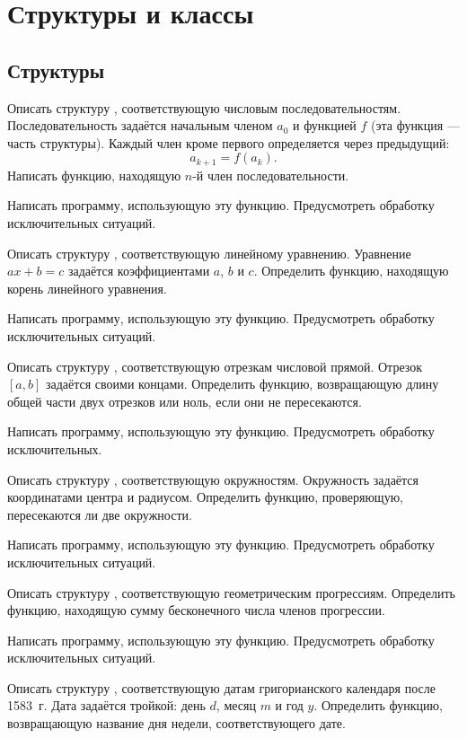 \section{Структуры и классы}

\subsection{Структуры}

\task Описать структуру , соответствующую числовым
последовательностям. Последовательность задаётся начальным членом
$a_0$ и функцией $f$ (эта функция — часть структуры). Каждый член
кроме первого определяется через предыдущий:
\[
a_{k+1} = f(a_k).
\]
Написать функцию, находящую $n$-й член последовательности.

Написать программу, использующую эту функцию. Предусмотреть обработку
исключительных ситуаций.

\task Описать структуру , соответствующую линейному
уравнению. Уравнение $ax+b=c$ задаётся коэффициентами $a$, $b$ и $c$.
Определить функцию, находящую корень линейного уравнения.

Написать программу, использующую эту функцию. Предусмотреть обработку
исключительных ситуаций.

\task Описать структуру , соответствующую отрезкам
числовой прямой. Отрезок $[a, b]$ задаётся своими концами. Определить
функцию, возвращающую длину общей части двух отрезков или ноль, если
они не пересекаются.

Написать программу, использующую эту функцию. Предусмотреть обработку
исключительных.

\task Описать структуру , соответствующую
окружностям. Окружность задаётся координатами центра и
радиусом. Определить функцию, проверяющую, пересекаются ли две
окружности.

Написать программу, использующую эту функцию. Предусмотреть обработку
исключительных ситуаций.

\task Описать структуру , соответствующую
геометрическим прогрессиям. Определить функцию, находящую сумму
бесконечного числа членов прогрессии.

Написать программу, использующую эту функцию. Предусмотреть обработку
исключительных ситуаций.

\task Описать структуру , соответствующую датам
григорианского календаря после 1583~г. Дата задаётся тройкой: день
$d$, месяц $m$ и год $y.$ Определить функцию, возвращающую название
дня недели, соответствующего дате.

